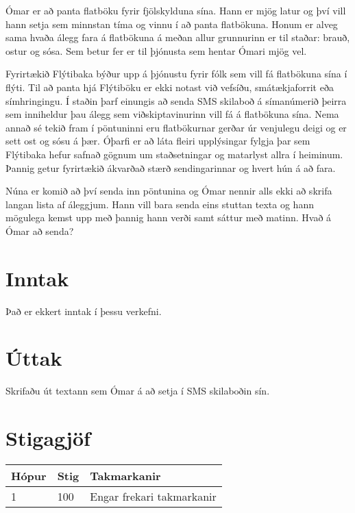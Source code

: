 
Ómar er að panta flatböku fyrir fjölskylduna sína.
Hann er mjög latur og því vill hann setja sem minnstan tíma og vinnu í að panta flatbökuna.
Honum er alveg sama hvaða álegg fara á flatbökuna á meðan allur grunnurinn er til staðar: brauð, ostur og sósa.
Sem betur fer er til þjónusta sem hentar Ómari mjög vel.

Fyrirtækið Flýtibaka býður upp á þjónustu fyrir fólk sem vill fá flatbökuna sína í flýti.
Til að panta hjá Flýtiböku er ekki notast við vefsíðu, smátækjaforrit eða símhringingu.
Í staðin þarf einungis að senda SMS skilaboð á símanúmerið þeirra sem inniheldur þau álegg sem viðskiptavinurinn vill fá á flatbökuna sína.
Nema annað sé tekið fram í pöntuninni eru flatbökurnar gerðar úr venjulegu deigi og er sett ost og sósu á þær.
Óþarfi er að láta fleiri upplýsingar fylgja þar sem Flýtibaka hefur safnað gögnum um staðsetningar og matarlyst allra í heiminum.
Þannig getur fyrirtækið ákvarðað stærð sendingarinnar og hvert hún á að fara.

Núna er komið að því senda inn pöntunina og Ómar nennir alls ekki að skrifa langan lista af áleggjum.
Hann vill bara senda eins stuttan texta og hann mögulega kemst upp með þannig hann verði samt sáttur með matinn.
Hvað á Ómar að senda?

\section*{Inntak}
Það er ekkert inntak í þessu verkefni.

\section*{Úttak}
Skrifaðu út textann sem Ómar á að setja í SMS skilaboðin sín.

\section*{Stigagjöf}
\begin{tabular}{|l|l|l|}
\hline
Hópur & Stig & Takmarkanir \\ \hline
1     & 100  & Engar frekari takmarkanir\\ \hline
\end{tabular}

